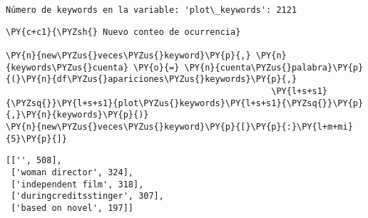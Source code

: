     \begin{Verbatim}[commandchars=\\\{\}]
Número de keywords en la variable: 'plot\_keywords': 2121
    \end{Verbatim}

    \begin{tcolorbox}[breakable, size=fbox, boxrule=1pt, pad at break*=1mm,colback=cellbackground, colframe=cellborder]
\begin{Verbatim}[commandchars=\\\{\}]
\PY{c+c1}{\PYZsh{} Nuevo conteo de ocurrencia}

\PY{n}{new\PYZus{}veces\PYZus{}keyword}\PY{p}{,} \PY{n}{keywords\PYZus{}cuenta} \PY{o}{=} \PY{n}{cuenta\PYZus{}palabra}\PY{p}{(}\PY{n}{df\PYZus{}apariciones\PYZus{}keywords}\PY{p}{,}
                                                    \PY{l+s+s1}{\PYZsq{}}\PY{l+s+s1}{plot\PYZus{}keywords}\PY{l+s+s1}{\PYZsq{}}\PY{p}{,}\PY{n}{keywords}\PY{p}{)}
\PY{n}{new\PYZus{}veces\PYZus{}keyword}\PY{p}{[}\PY{p}{:}\PY{l+m+mi}{5}\PY{p}{]}
\end{Verbatim}
\end{tcolorbox}

            \begin{tcolorbox}[breakable, size=fbox, boxrule=.5pt, pad at break*=1mm, opacityfill=0]
\begin{Verbatim}[commandchars=\\\{\}]
[['', 508],
 ['woman director', 324],
 ['independent film', 318],
 ['duringcreditsstinger', 307],
 ['based on novel', 197]]
\end{Verbatim}
\end{tcolorbox}
        
